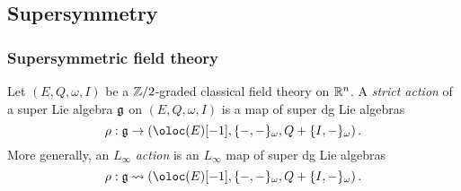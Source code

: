 \documentclass[10pt, oneside]{article}
\begin{document}
\subsection{Supersymmetry} \label{sec: susy}


\subsubsection{Supersymmetric field theory}


\begin{dfn}
Let $(E,Q,\omega, I)$ be a $\mathbb Z/2$-graded classical field theory on $\mathbb R^n$. 
A {\em strict action} of a super Lie algebra $\mathfrak g$ on $(E,Q,\omega, I)$ is a map of super dg Lie algebras
\[
\rho : \fg \to \left(\oloc(E)[-1] , \{-,-\}_\omega, Q + \{I,-\}_\omega\right) .
\]
More generally, an $L_\infty$ {\em action} is an $L_\infty$ map of super dg Lie algebras
\[
\rho : \fg \rightsquigarrow \left(\oloc(E)[-1] , \{-,-\}_\omega, Q + \{I,-\}_\omega\right) .
\]
\end{dfn}
\end{document}
